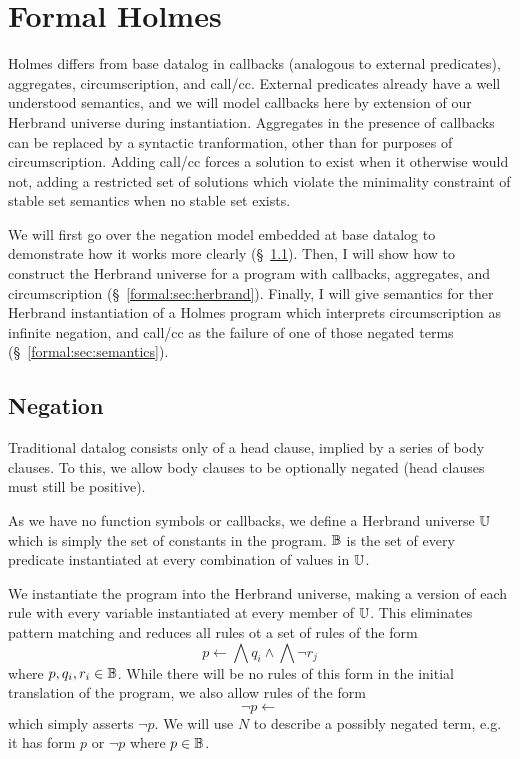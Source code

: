 
\chapter{Formal Holmes}
\label{chap:formal}
Holmes differs from base datalog in callbacks (analogous to external predicates), aggregates, circumscription, and call/cc.
External predicates already have a well understood semantics, and we will model callbacks here by extension of our Herbrand universe during instantiation.
Aggregates in the presence of callbacks can be replaced by a syntactic tranformation, other than for purposes of circumscription.
Adding call/cc forces a solution to exist when it otherwise would not, adding a restricted set of solutions which violate the minimality constraint of stable set semantics when no stable set exists.

We will first go over the negation model embedded at base datalog to demonstrate how it works more clearly (\S~\ref{formal:sec:negation}).
Then, I will show how to construct the Herbrand universe for a program with callbacks, aggregates, and circumscription (\S~\ref{formal:sec:herbrand}).
Finally, I will give semantics for ther Herbrand instantiation of a Holmes program which interprets circumscription as infinite negation, and call/cc as the failure of one of those negated terms (\S~\ref{formal:sec:semantics}).
\section{Negation}
\label{formal:sec:negation}
Traditional datalog consists only of a head clause, implied by a series of body clauses.
To this, we allow body clauses to be optionally negated (head clauses must still be positive).

As we have no function symbols or callbacks, we define a Herbrand universe $\mathbb{U}$ which is simply the set of constants in the program.
$\mathbb{B}$ is the set of every predicate instantiated at every combination of values in $\mathbb{U}$.

We instantiate the program into the Herbrand universe, making a version of each rule with every variable instantiated at every member of $\mathbb{U}$.
This eliminates pattern matching and reduces all rules ot a set of rules of the form
\[
	p \leftarrow \bigwedge q_i \wedge \bigwedge \neg r_j
\]
where $p, q_i, r_i \in \mathbb{B}$.
While there will be no rules of this form in the initial translation of the program, we also allow rules of the form
\[
	\neg p \leftarrow
\]
which simply asserts $\neg p$.
We will use $N$ to describe a possibly negated term, e.g. it has form $p$ or $\neg p$ where $p \in \mathbb{B}$.

